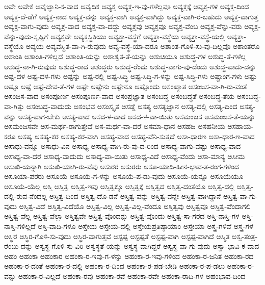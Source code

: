 {ಅವೇ
ಅವೇಕೆ
ಅವೈಜ್ಞಾನಿ-ಕ-ವಾದ
ಅವೈದಿಕ
ಅವ್ಯಕ್ತ
ಅವ್ಯಕ್ತ-ಇ-ವು-ಗಳೆಲ್ಲವೂ
ಅವ್ಯಕ್ತಕ್ಕೆ
ಅವ್ಯಕ್ತ-ಗಳ
ಅವ್ಯಕ್ತ-ದಿಂದ
ಅವ್ಯಕ್ತ-ದೆ-ಡೆಗೆ
ಅವ್ಯಕ್ತ-ನಾದ
ಅವ್ಯಕ್ತ-ವನ್ನು
ಅವ್ಯಕ್ತ-ವಾಗಿ
ಅವ್ಯಕ್ತ-ವಾಗಿದ್ದು
ಅವ್ಯಕ್ತ-ವಾಗಿ-ರ-ಬಹುದು
ಅವ್ಯಕ್ತ-ವಾಗುತ್ತ
ಅವ್ಯಕ್ತ-ವಾಗು-ವುದು
ಅವ್ಯಕ್ತ-ವಾದ
ಅವ್ಯಕ್ತ-ವಾ-ದದ್ದು
ಅವ್ಯಕ್ತವು
ಅವ್ಯಕ್ತವೂ
ಅವ್ಯಕ್ತ-ವೆಂಬ
ಅವ್ಯಕ್ತ-ವೆನ್ನು-ವರು
ಅವ್ಯಕ್ತ-ವೆನ್ನು-ವುದು-ಸೃಷ್ಟಿಗೆ
ಅವ್ಯಕ್ತವೇ
ಅವ್ಯಕ್ತಸ್ಥಿತಿಯು
ಅವ್ಯಕ್ತಾ-ವಸ್ಥೆಗೆ
ಅವ್ಯಕ್ತಾ-ವಸ್ಥೆಯ
ಅವ್ಯಕ್ತಾ-ವಸ್ಥೆ-ಯಲ್ಲಿ
ಅವ್ಯಕ್ತಾ-ವಸ್ಥೆಯೊ
ಅವ್ಯಯ
ಅವ್ಯವಸ್ಥಿತ-ವಾ-ಗಿ-ರುವುದು
ಅವ್ಯ-ವಸ್ಥೆ-ಯಾ-ದರೂ
ಅಶಾಂತ-ಗೊಳಿ-ಸು-ವು-ದಿಲ್ಲವೊ
ಅಶಾಂತರೊ
ಅಶಾಂತಿ
ಅಶಾಂತಿ-ಗಳಿಲ್ಲದೆ
ಅಶಾಂತಿ-ಯನ್ನು
ಅಶಾಶ್ವತ-ತೆ-ಯನ್ನು
ಅಶುಚಿಯೂ
ಅಶುದ್ಧ-ಗಳ
ಅಶುದ್ಧ-ತೆ-ಗಳೆಲ್ಲ
ಅಶುದ್ಧ-ನಾ-ಗಿ-ರುವುದು
ಅಶುದ್ಧ-ರಾದ
ಅಶುದ್ಧರು
ಅಶುದ್ಧ-ರೆಂದು
ಅಶುದ್ಧ-ವಾಗು-ವು-ದೆಂದು
ಅಶುದ್ಧ-ವಾದು-ದನ್ನು
ಅಷ್ಟ-ದಳ
ಅಷ್ಟ-ದಳ-ಗಳು
ಅಷ್ಟನ್ನು
ಅಷ್ಟ-ರಲ್ಲಿ
ಅಷ್ಟ-ಸಿದ್ಧಿ
ಅಷ್ಟ-ಸಿದ್ಧಿ-ಗ-ಳನ್ನು
ಅಷ್ಟ-ಸಿದ್ಧಿ-ಗಳು
ಅಷ್ಟಾಂಗ-ಗಳು
ಅಷ್ಟು
ಅಷ್ಟೂ
ಅಷ್ಟೆ
ಅಷ್ಟೆ-ದೇವ-ತೆ-ಗಳ
ಅಷ್ಟೇ
ಅಷ್ಟೇನು
ಅಷ್ಟೇನೂ
ಅಷ್ಟೊಂದು
ಅಸಂಖ್ಯಾತ
ಅಸಂಜಸ-ವಾ-ಗಿ-ರು-ವಂತೆ
ಅಸಂಜಸ-ವಾದ
ಅಸಂಪೂರ್ಣ
ಅಸಂಪೂರ್ಣ-ವಾದ
ಅಸಂಪ್ರಜ್ಞಾತ
ಅಸಂಬದ್ಧ
ಅಸಂಬದ್ಧತೆ
ಅಸಂಬದ್ಧ-ತೆಯ
ಅಸಂಬದ್ಧ-ವಾ-ಗಿತ್ತು
ಅಸಂಬದ್ಧ-ವಾದುದು
ಅಸಂಭವ
ಅಸಂಸ್ಕೃತ
ಅಸಡ್ಡೆ
ಅಸತ್ಯ
ಅಸತ್ಯಜ್ಞಾನ
ಅಸತ್ಯ-ದಲ್ಲಿ
ಅಸತ್ಯ-ದಿಂದ
ಅಸತ್ಯ-ವನ್ನು
ಅಸತ್ಯ-ವಾಗ-ಬೇಕು
ಅಸತ್ಯ-ವಾದ
ಅಸದ-ಳ-ವಾದ
ಅಸದ-ಳ-ವಾ-ಯಿತು
ಅಸಮಂಜಸ
ಅಸಮಂಜಸ-ತೆ-ಯನ್ನು
ಅಸಮಂಜಸವೇ
ಅಸ-ಮರ್ಥ-ರಾಗುತ್ತೇವೆ
ಅಸ-ಮರ್ಥ-ವಾ-ದರೆ
ಅಸಮಾ-ಧಾನ
ಅಸಹಜ
ಅಸಹನೀಯ
ಅಸಹಾಯ-ಕರೂ
ಅಸಹ್ಯ
ಅಸಹ್ಯ-ಕರ
ಅಸಹ್ಯ-ಕರ-ವಾಗಿ
ಅಸಹ್ಯ-ವಾದ
ಅಸಹ್ಯ-ವೆನಿ-ಸುತ್ತದೆ
ಅಸಾ-ಧಾರಣ
ಅಸಾ-ಧಾರ-ಣ-ವಾದ
ಅಸಾಧು-ವನ್ನೂ
ಅಸಾಧು-ವಿನ
ಅಸಾಧ್ಯ
ಅಸಾಧ್ಯ-ವಾಗಿ-ರು-ವು-ದ-ರಿಂದ
ಅಸಾಧ್ಯ-ವಾಗು-ವಷ್ಟು
ಅಸಾಧ್ಯ-ವಾದ
ಅಸಾಧ್ಯ-ವಾ-ದರೆ
ಅಸಾಧ್ಯ-ವಾದುದು
ಅಸಾಧ್ಯ-ವಾ-ಯಿತು
ಅಸಾಧ್ಯ-ವಿದೆ
ಅಸಾಧ್ಯ-ವೆಂದು
ಅಸಾ-ಮಾನ್ಯ
ಅಸೀಮ
ಅಸುಖಿ-ಯನ್ನಾಗಿ
ಅಸುಖಿ-ಯಾಗಿ-ರು-ವೆವು
ಅಸುರರ
ಅಸುರರು
ಅಸೂ-ಯಾದಿ-ಹೀನ-ಭಾವ-ತ-ರಂಗ-ಗಳಿಂದ
ಅಸೂಯಾ-ಪರರು
ಅಸೂಯೆ
ಅಸೂಯೆ-ಗ-ಳನ್ನು
ಅಸೂಯೆ-ಪ-ಡು-ವುದು
ಅಸೂಯೆ-ಯನ್ನೂ
ಅಸೂಯೆಯೂ
ಅಸೂಯೆ-ಯೆಲ್ಲ
ಅಸ್ತಿ
ಅಸ್ತಿತ್ವ
ಅಸ್ತಿತ್ವ-ಇವು
ಅಸ್ತಿತ್ವಕ್ಕೂ
ಅಸ್ತಿತ್ವಕ್ಕೆ
ಅಸ್ತಿತ್ವದ
ಅಸ್ತಿತ್ವ-ದಂತೆಯೊ
ಅಸ್ತಿತ್ವ-ದಲ್ಲಿ
ಅಸ್ತಿತ್ವ-ದಲ್ಲಿ-ರುವ-ನೆಂದಲ್ಲ
ಅಸ್ತಿತ್ವ-ದಿಂದ
ಅಸ್ತಿತ್ವ-ದೊ-ಡನೆ
ಅಸ್ತಿತ್ವ-ವನ್ನು
ಅಸ್ತಿತ್ವ-ವನ್ನೇ
ಅಸ್ತಿತ್ವ-ವಾಗಿದ್ದಾನೆ
ಅಸ್ತಿತ್ವ-ವಾ-ಗು-ವುದು
ಅಸ್ತಿತ್ವ-ವಿದೆ
ಅಸ್ತಿತ್ವ-ವಿದೆಯೊ
ಅಸ್ತಿತ್ವ-ವಿಲ್ಲ
ಅಸ್ತಿತ್ವ-ವಿಲ್ಲ-ವೆಂದೂ
ಅಸ್ತಿತ್ವವು
ಅಸ್ತಿತ್ವವೂ
ಅಸ್ತಿತ್ವ-ವೆಂದಾಗಲಿ
ಅಸ್ತಿತ್ವ-ವೆಲ್ಲ
ಅಸ್ತಿತ್ವ-ವೆಲ್ಲಾ
ಅಸ್ತಿತ್ವವೇ
ಅಸ್ತಿತ್ವ-ವೊಂದನ್ನು
ಅಸ್ತಿತ್ವ-ವೊಂದು
ಅಸ್ತಿತ್ವ-ಸಾ-ಗರದ
ಅಸ್ತಿ-ನಾಸ್ತಿ-ಗಳ
ಅಸ್ತಿ-ನಾಸ್ತಿ-ಗಳಿಲ್ಲದೆ
ಅಸ್ತಿ-ವಾದಿ-ಗಳೂ
ಅಸ್ತೇಯ
ಅಸ್ತೇಯ-ದಲ್ಲಿ
ಅಸ್ತೇಯಪ್ರತಿಷ್ಠಾಯಾಂ
ಅಸ್ತೇಯಾ
ಅಸ್ತ್ರ-ಗಳಿವೆ
ಅಸ್ತ್ರ-ಗಳೆ
ಅಸ್ಥಿರ
ಅಸ್ಥಿರ-ಗೊಳಿ-ಸು-ವುದು
ಅಸ್ಥಿರ-ವಾಗುತ್ತವೆ
ಅಸ್ಪಷ್ಟ
ಅಸ್ಪಷ್ಟತೆ
ಅಸ್ಪಷ್ಟ-ವಾಗಿ
ಅಸ್ಪಷ್ಟ-ವಾಗಿದೆ
ಅಸ್ಮಿತ
ಅಸ್ವ-ತಂತ್ರ-ರೆಂಬು-ದನ್ನು
ಅಸ್ವಸ್ಥ-ಗೊಳಿ-ಸು-ವಿರಿ
ಅಸ್ವಸ್ಥತೆ-ಯನ್ನು
ಅಸ್ವಸ್ಥ-ವಾಗಿದ್ದರೆ
ಅಸ್ವಸ್ಥ-ವಾ-ಗು-ವುದು
ಅಸ್ವಾ-ಭಾವಿ-ಕ-ವಾದ
ಅಹಂ
ಅಹಂಕಾ
ಅಹಂಕಾರ
ಅಹಂಕಾ-ರ-ಇವು-ಗ-ಳನ್ನು
ಅಹಂಕಾ-ರ-ಇವು-ಗಳಿಂದ
ಅಹಂಕಾ-ರ-ಜನಿತ
ಅಹಂಕಾ-ರದ
ಅಹಂಕಾ-ರ-ದಂತೆ
ಅಹಂಕಾ-ರ-ದಲ್ಲಿ
ಅಹಂಕಾ-ರ-ದಿಂದ
ಅಹಂಕಾ-ರ-ಪಡ-ಬೇಡಿ
ಅಹಂಕಾ-ರ-ಪ-ಡಲು
ಅಹಂಕಾ-ರ-ವನ್ನು
ಅಹಂಕಾ-ರ-ವಿಲ್ಲದೆ
ಅಹಂಕಾ-ರವು
ಅಹಂಕಾ-ರವೆ
ಅಹಂಕಾ-ರವೇ
ಅಹಂಕಾ-ರಾದಿ-ಗಳ
ಅಹಂಭಾವ-ದಿಂದ
}
